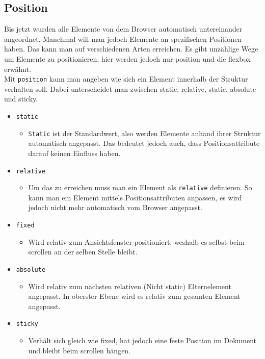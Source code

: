 \documentclass{article}
\begin{document}
\begin{itemize}
	\subsection{Position}
	Bis jetzt wurden alle Elemente von dem Browser automatisch untereinander angeordnet. Manchmal will man jedoch Elemente an spezifischen Positionen haben. Das kann man auf verschiedenen Arten erreichen. Es gibt unzählige Wege um Elemente zu positionieren, hier werden jedoch nur position und die flexbox erwähnt. \\
	Mit \texttt{position} kann man angeben wie sich ein Element innerhalb der Struktur verhalten soll. Dabei unterscheidet man zwischen static, relative, static, absolute und sticky. 
	\begin{itemize}
		\item{\texttt{static}}
		\begin{itemize}
			\item{\texttt{Static} ist der Standardwert, also werden Elemente anhand ihrer Struktur automatisch angepasst. Das bedeutet jedoch auch, dass Positionsattribute darauf keinen Einfluss haben. }
		\end{itemize}
		\item{\texttt{relative}}
		\begin{itemize}
			\item{Um das zu erreichen muss man ein Element als \texttt{relative} definieren. So kann man ein Element mittels Positionsattributen anpassen, es wird jedoch nicht mehr automatisch vom Browser angepasst.}
		\end{itemize}
		\item{\texttt{fixed}}
		\begin{itemize}
			\item{Wird relativ zum Ansichtsfenster positioniert, weshalb es selbst beim scrollen an der selben Stelle bleibt.}
		\end{itemize}
		\item{\texttt{absolute}}
		\begin{itemize}
			\item{Wird relativ zum nächsten relativen (Nicht static) Elternelement angepasst. In oberster Ebene wird es relativ zum gesamten Element angepasst.}
		\end{itemize}
		\item{\texttt{sticky}}
		\begin{itemize}
			\item{Verhält sich gleich wie fixed, hat jedoch eine feste Position im Dokument und bleibt beim scrollen hängen.}
		\end{itemize}
	\end{itemize}

\end{itemize}
\end{document}
